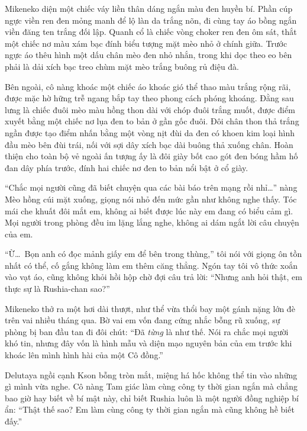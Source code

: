 ﻿\documentclass[../main.tex]{subfiles}
\begin{document}
Mikeneko diện một chiếc váy liền thân dáng ngắn màu đen huyền bí. Phần cúp ngực viền ren đen mỏng manh để lộ làn da trắng nõn, đi cùng tay áo bồng ngắn viền đăng ten trắng đối lập. Quanh cổ là chiếc vòng choker ren đen ôm sát, thắt một chiếc nơ màu xám bạc đính biểu tượng mặt mèo nhỏ ở chính giữa. Trước ngực áo thêu hình một dấu chân mèo đen nhỏ nhắn, trong khi dọc theo eo bên phải là dải xích bạc treo chùm mặt mèo trắng buông rủ điệu đà.

Bên ngoài, cô nàng khoác một chiếc áo khoác gió thể thao màu trắng rộng rãi, được mặc hờ hững trễ ngang bắp tay theo phong cách phóng khoáng. Đằng sau lưng là chiếc đuôi mèo màu hồng thon dài với chóp đuôi trắng muốt, được điểm xuyết bằng một chiếc nơ lụa đen to bản ở gần gốc đuôi. Đôi chân thon thả trắng ngần được tạo điểm nhấn bằng một vòng nịt đùi da đen có khoen kim loại hình đầu mèo bên đùi trái, nối với sợi dây xích bạc dài buông thả xuống chân. Hoàn thiện cho toàn bộ vẻ ngoài ấn tượng ấy là đôi giày bốt cao gót đen bóng hầm hố đan dây phía trước, đính hai chiếc nơ đen to bản nổi bật ở cổ giày.

\chrint

``Chắc mọi người cũng đã biết chuyện qua các bài báo trên mạng rồi nhỉ\dots'' nàng Mèo hồng cúi mặt xuống, giọng nói nhỏ đến mức gần như không nghe thấy. Tóc mái che khuất đôi mắt em, không ai biết được lúc này em đang có biểu cảm gì. Mọi người trong phòng đều im lặng lắng nghe, không ai dám ngắt lời câu chuyện của em.

``Ừ\dots\ Bọn anh có đọc mảnh giấy em để bên trong thùng,'' tôi nói với giọng ôn tồn nhất có thể, cố gắng không làm em thêm căng thẳng. Ngón tay tôi vô thức xoắn vào vạt áo, cũng không khỏi hồi hộp chờ đợi câu trả lời: ``Nhưng anh hỏi thật, em thực sự là Rushia-chan sao?''

Mikeneko thở ra một hơi dài thượt, như thể vừa thổi bay một gánh nặng lớn đè trên vai nhiều tháng qua. Bờ vai em vốn đang cứng nhắc bỗng rũ xuống, sự phòng bị ban đầu tan đi đôi chút: ``Đã \emph{từng} là như thế. Nói ra chắc mọi người khó tin, nhưng đây vốn là hình mẫu và diện mạo nguyên bản của em trước khi khoác lên mình hình hài của một Cô đồng.''

Delutaya ngồi cạnh Kson bỗng tròn mắt, miệng há hốc không thể tin vào những gì mình vừa nghe. Cô nàng Tam giác làm cùng công ty thời gian ngắn mà chẳng bao giờ hay biết về bí mật này, chỉ biết Rushia luôn là một người đồng nghiệp bí ẩn: ``Thật thế sao? Em làm cùng công ty thời gian ngắn mà cũng không hề biết đấy.''
\end{document}
